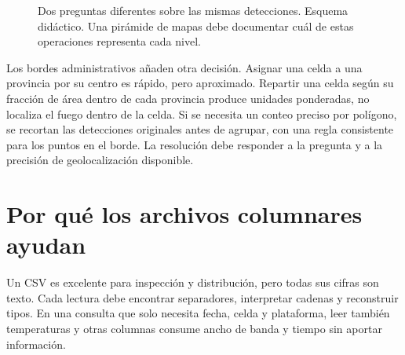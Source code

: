 \begin{figure}[ht]
\centering
{}
\caption{Dos preguntas diferentes sobre las mismas detecciones. Esquema didáctico. Una pirámide
de mapas debe documentar cuál de estas operaciones representa cada nivel.}
\label{fig:agregacion}
\end{figure}

Los bordes administrativos añaden otra decisión. Asignar una celda a una provincia por
su centro es rápido, pero aproximado. Repartir una celda según su fracción de área dentro
de cada provincia produce unidades ponderadas, no localiza el fuego dentro de la celda.
Si se necesita un conteo preciso por polígono, se recortan las detecciones originales
antes de agrupar, con una regla consistente para los puntos en el borde. La resolución
debe responder a la pregunta y a la precisión de geolocalización disponible.

\FloatBarrier
\section{Por qué los archivos columnares ayudan}

Un CSV es excelente para inspección y distribución, pero todas sus cifras son texto.
Cada lectura debe encontrar separadores, interpretar cadenas y reconstruir tipos. En
una consulta que solo necesita fecha, celda y plataforma, leer también temperaturas y
otras columnas consume ancho de banda y tiempo sin aportar información.

